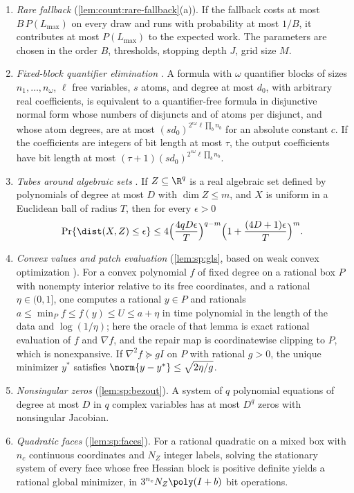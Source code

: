 \begin{enumerate}[label=(T\arabic*),leftmargin=*]
minimizer, each coordinate in root representation, within $B\poly_d(I+b)$
bit operations, and refinements to $q$ bits within $B\poly_d(I+b+q)$.
\item\label{it:app:rec:rare} \emph{Rare fallback}
(\cref{lem:count:rare-fallback}(a)). If the fallback costs at most
$B\,P(L_{\max})$ on every draw and runs with probability at most $1/B$, it
contributes at most $P(L_{\max})$ to the expected work. The parameters are
chosen in the order $B$, thresholds, stopping depth $J$, grid size $M$.
\item\label{it:app:rec:qe} \emph{Fixed-block quantifier elimination}
\citep[Theorem~1.1]{renegar1992-on-the-computational-complexity-and}. A formula with $\omega$ quantifier blocks
of sizes $n_1,\ldots,n_\omega$, $\ell$ free variables, $s$ atoms, and degree
at most $d_0$, with arbitrary real coefficients, is equivalent to a
quantifier-free formula in disjunctive normal form whose numbers of
disjuncts and of atoms per disjunct, and whose atom degrees, are at most
$(sd_0)^{2^{c\omega}\ell\prod_bn_b}$ for an absolute constant $c$. If the
coefficients are integers of bit length at most $\tau$, the output
coefficients have bit length at most $(\tau+1)(sd_0)^{2^{c\omega}\ell\prod_bn_b}$.
\item\label{it:app:rec:tube} \emph{Tubes around algebraic sets}
\citep[Theorem~1.1]{basu2023-hausdorff-approximations-and-volume-of}. If $Z\subseteq\R^q$ is a real algebraic
set defined by polynomials of degree at most $D$ with $\dim Z\le m$, and $X$
is uniform in a Euclidean ball of radius $T$, then for every $\epsilon>0$
\[
 \Pr\{\dist(X,Z)\le\epsilon\}
 \le4\Bigl(\frac{4qD\epsilon}T\Bigr)^{q-m}\Bigl(1+\frac{(4D+1)\epsilon}T\Bigr)^m .
\]
\item\label{it:app:rec:gls} \emph{Convex values and patch evaluation}
(\cref{lem:sp:gls}, based on weak convex optimization
\citep[Corollary~4.2.7]{grotschel1988-geometric-algorithms-and-combinatorial-optimization}). For a convex
polynomial $f$ of fixed degree on a rational box $P$ with nonempty interior
relative to its free coordinates, and a rational $\eta\in(0,1]$, one computes
a rational $y\in P$ and rationals $a\le\min_Pf\le f(y)\le U\le a+\eta$ in
time polynomial in the length of the data and $\log(1/\eta)$; here the
oracle of that lemma is exact rational evaluation of $f$ and $\nabla f$, and
the repair map is coordinatewise clipping to $P$, which is nonexpansive. If
$\nabla^2f\succeq gI$ on $P$ with rational $g>0$, the unique minimizer $y^*$
satisfies $\norm{y-y^*}\le\sqrt{2\eta/g}$.
\item\label{it:app:rec:bezout} \emph{Nonsingular zeros} (\cref{lem:sp:bezout}).
A system of $q$ polynomial equations of degree at most $D$ in $q$ complex
variables has at most $D^q$ zeros with nonsingular Jacobian.
\item\label{it:app:rec:faces} \emph{Quadratic faces} (\cref{lem:sp:faces}).
For a rational quadratic on a mixed box with $n_c$ continuous coordinates
and $N_Z$ integer labels, solving the stationary system of every face whose
free Hessian block is positive definite yields a rational global minimizer,
in $3^{n_c}N_Z\poly(I+b)$ bit operations.
\end{enumerate}

